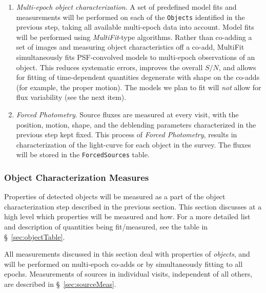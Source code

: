 \documentclass[12pt]{article}
\newcommand{\code}[1]{\texttt{#1}}
\newcommand{\Object}{\code{Object}\xspace}
\newcommand{\Objects}{\code{Objects}\xspace}
\newcommand{\ForcedSources}{\code{ForcedSources}\xspace}
\begin{document}
\begin{enumerate}
    The deblender will make use of all information available at this stage, including the knowledge of peak positions, bands, time, time variability (from Level 1), Galactic longitude and latitude, etc. The output of this stage is a list of (uncharacterized) \Objects\footnote{Depending on the exact implementation of the deblender, this stage may also attach significant metadata (eg, deblended footprints and pixel-weight maps) to each deblended \Object record.}.
    \item {\em Multi-epoch object characterization}. A set of predefined model fits and measurements will be performed on each of the \Objects identified in the previous step, taking all available multi-epoch data into account. Model fits will be performed using {\em MultiFit}-type algorithms. Rather than co-adding a set of images and measuring object characteristics off a co-add, MultiFit simultaneously fits PSF-convolved models to multi-epoch observations of an object. This reduces systematic errors, improves the overall $S/N$, and allows for fitting of time-dependent quantities degenerate with shape on the co-adds (for example, the proper motion). The models we plan to fit will {\em not} allow for flux variability (see the next item).
    \item {\em Forced Photometry}. Source fluxes are measured at every visit, with the position, motion, shape, and the deblending parameters characterized in the previous step kept fixed. This process of {\em Forced Photometry}, results in characterization of the light-curve for each object in the survey. The fluxes will be stored in the \ForcedSources table.
\end{enumerate}

\subsubsection{Object Characterization Measures}

Properties of detected objects will be measured as a part of the object characterization step described in the previous section. This section discusses at a high level which properties will be measured and how. For a more detailed list and description of quantities being fit/measured, see the table in \S~\ref{sec:objectTable}.

All measurements discussed in this section deal with properties of {\em objects}, and will be performed on multi-epoch co-adds or by simultaneously fitting to all epochs. Measurements of sources in individual visits, independent of all others, are described in \S~\ref{sec:sourceMeas}.
\end{document}
